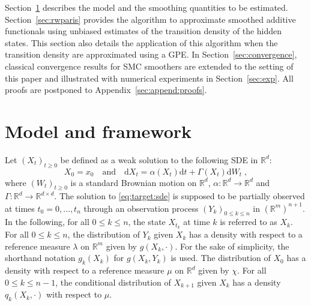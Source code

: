 \documentclass[12pt]{article}
\newcommand{\rmd}{\mathrm{d}}
\newcommand{\eqsp}{\;}
\newcommand{\1}{\mathrm{1}}
\newcommand{\qk}{q_{k}}
\begin{document}
Section~\ref{sec:model} describes the model and the smoothing quantities to be estimated. Section~\ref{sec:rwparis} provides the algorithm to approximate smoothed additive functionals using unbiased estimates of the transition density of the hidden states. This section also details the application of this algorithm when the transition density are approximated using a GPE. 
In Section~\ref{sec:convergence}, classical convergence results for SMC smoothers are extended to the setting of this paper and illustrated with numerical experiments in Section~\ref{sec:exp}. 
All proofs are postponed to Appendix~\ref{sec:append:proofs}.

\section{Model and framework}
\label{sec:model}
Let $(X_t)_{t\ge 0}$ be defined as a weak solution to the following SDE in $\mathbb{R}^d$:
\begin{equation}
\label{eq:target:sde}
X_0 = x_0\quad\mbox{and}\quad \rmd X_t = \alpha(X_t)\rmd t + \Gamma(X_t)\rmd W_t\eqsp,
\end{equation}
where $(W_t)_{t\ge 0}$ is a standard Brownian motion on $\mathbb{R}^d$, $\alpha: \mathbb{R}^d\to\mathbb{R}^d$ and $\Gamma: \mathbb{R}^d\to \mathbb{R}^{d\times d}$. The solution to \eqref{eq:target:sde} is supposed to be partially observed at times $t_0=0,\dots,t_n$ through an observation process $(Y_k)_{0\le k \le n}$ in $(\mathbb{R}^m)^{n+1}$.  In the following, for all $0 \le k \le n$, the state $X_{t_k}$ at time $k$ is referred to as $X_k$. For all $0\le k \le n$, the distribution of $Y_k$ given $X_k$ has a density with respect to a reference measure $\lambda$ on $\mathbb{R}^m$ given by $g(X_k,\cdot)$. For the sake of simplicity, the shorthand notation $g_k(X_k)$ for $g(X_k,Y_k)$ is used. 
The distribution of $X_0$ has a density with respect to a reference measure $\mu$ on $\mathbb{R}^d$ given by $\chi$.
For all $0\le k \le n-1$, the conditional distribution of $X_{k+1} $ given $X_{k}$ has a density $\qk(X_{k},\cdot)$ with respect to $\mu$. 
\end{document}
